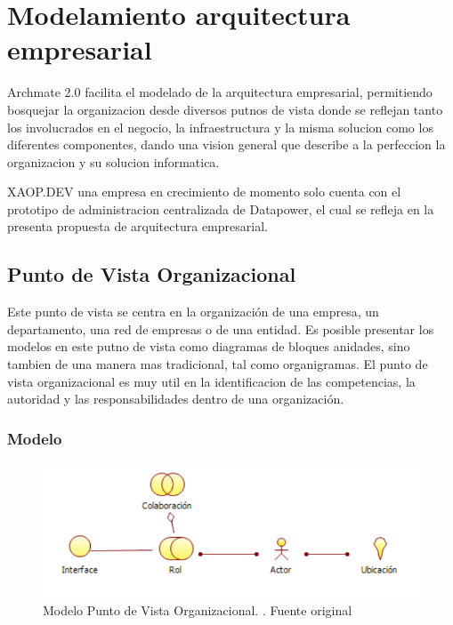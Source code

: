 \section{Modelamiento arquitectura empresarial}
Archmate 2.0 facilita el modelado de la arquitectura empresarial, permitiendo bosquejar la organizacion desde diversos putnos de vista donde se reflejan tanto los involucrados en el negocio, la infraestructura y la misma solucion como los diferentes componentes, dando una vision general que describe a la perfeccion la organizacion y su solucion informatica.

XAOP.DEV una empresa en crecimiento de momento solo cuenta con el prototipo de administracion centralizada de Datapower, el cual se refleja en la presenta propuesta de arquitectura empresarial.

\newpage

\subsection{Punto de Vista Organizacional}
Este punto de vista se centra en la organización de una empresa, un departamento, una red de empresas o de una entidad. Es posible presentar los modelos en este putno de vista como diagramas de bloques anidades, sino tambien de una manera mas tradicional, tal como organigramas. El punto de vista organizacional es muy util en la identificacion de las competencias, la autoridad y las responsabilidades dentro de una organización.
\subsubsection{Modelo}
    \begin{figure}[th!]
        \centering
        \includegraphics[width=1.0\textwidth]{Arquitectura/images/modelo/Punto_de_Vista_de_Organizacion.pdf}
        \caption{Modelo Punto de Vista Organizacional. . Fuente original}
    \end{figure}
\newpage
